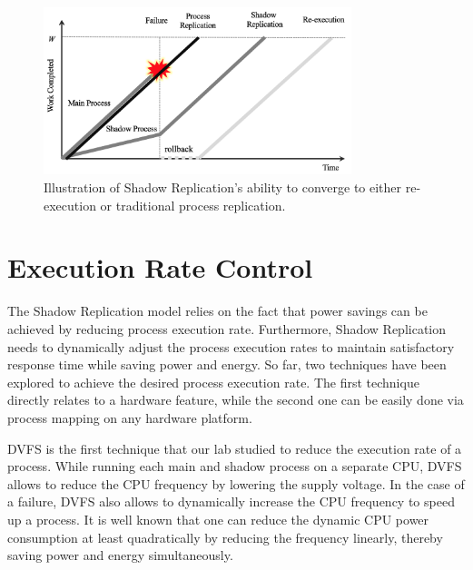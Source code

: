 \begin{figure}[t]
	\begin{center}
		\includegraphics[width=0.8\textwidth]{Figures/three_lines}
	\end{center}
	\caption{Illustration of Shadow Replication's ability to converge to either re-execution or traditional process replication.}
	\label{fig:three_lines}
\end{figure}

\section{Execution Rate Control}

The Shadow Replication model relies on the fact that power savings can be achieved by reducing process execution rate. Furthermore, Shadow Replication needs to dynamically adjust the process execution rates to maintain satisfactory response time while saving power and energy. So far, two techniques have been explored to achieve the desired process execution rate. The first technique directly relates to a hardware feature, while the second one can be easily done via process mapping on any hardware platform.

DVFS is the first technique that our lab studied to reduce the execution rate of a process. While running each main and shadow process on a separate CPU, DVFS allows to reduce the CPU frequency by lowering the supply voltage. In the case of a failure, DVFS also allows to dynamically increase the CPU frequency to speed up a process. It is well known that one can reduce the dynamic CPU power consumption at least quadratically by reducing the frequency linearly, thereby saving power and energy simultaneously. %

